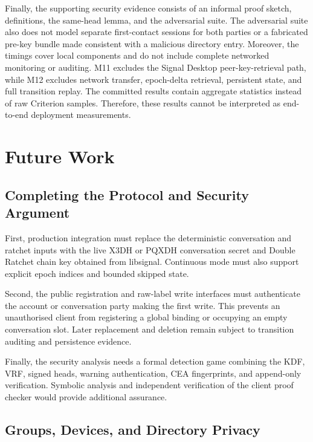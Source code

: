 Finally, the supporting security evidence consists of an informal proof sketch, definitions, the
same-head lemma, and the adversarial suite. The adversarial suite also does not model separate
first-contact sessions for both parties or a fabricated pre-key bundle made consistent with a
malicious directory entry. Moreover, the timings cover local components and do not include complete
networked monitoring or auditing. M11 excludes the Signal Desktop peer-key-retrieval path, while
M12 excludes network transfer, epoch-delta retrieval, persistent state, and full transition replay.
The committed results contain aggregate statistics instead of raw Criterion samples. Therefore, these
results cannot be interpreted as end-to-end deployment measurements.

\section{Future Work}\label{sec:disc-future}

\subsection{Completing the Protocol and Security Argument}

First, production integration must replace the deterministic conversation and ratchet inputs with
the live X3DH or PQXDH conversation secret and Double Ratchet chain key obtained from libsignal.
Continuous mode must also support explicit epoch indices and bounded skipped state.

Second, the public registration and raw-label write interfaces must authenticate the account or
conversation party making the first write. This prevents an unauthorised client from registering a
global binding or occupying an empty conversation slot. Later replacement and deletion remain
subject to transition auditing and persistence evidence.

Finally, the security analysis needs a formal detection game combining the KDF, VRF, signed heads,
warning authentication, CEA fingerprints, and append-only verification. Symbolic analysis and
independent verification of the client proof checker would provide additional assurance.

\subsection{Groups, Devices, and Directory Privacy}

